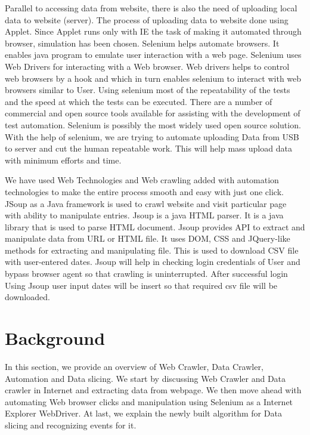 \documentclass[12pt]{report}
\begin{document}
Parallel to accessing data from website, there is also the need of uploading local data to website (server). The process of uploading data to website done using Applet. Since Applet runs only with IE the task of making it automated through browser, simulation has been chosen. Selenium helps automate browsers. It enables java program to emulate user interaction with a web page. Selenium uses Web Drivers for interacting with a Web browser. Web drivers helps to control web browsers by a hook and which in turn enables selenium to interact with web browsers similar to User. Using selenium most of the repeatability of the tests and the speed at which the tests can be executed. There are a number of commercial and open source tools available for assisting with the development of test automation. Selenium is possibly the most widely used open source solution. With the help of selenium, we are trying to automate uploading Data from USB to server and cut the human repeatable work. This will help mass upload data with minimum efforts and time.

We have used Web Technologies and Web crawling added with automation technologies to make the entire process smooth and easy with just one click. JSoup as a Java framework is used to crawl website and visit particular page with ability to manipulate entries. Jsoup is a java HTML parser. It is a java library that is used to parse HTML document. Jsoup provides API to extract and manipulate data from URL or HTML file. It uses DOM, CSS and JQuery-like methods for extracting and manipulating file. This is used to download CSV file with user-entered dates. Jsoup will help in checking login credentials of User and bypass browser agent so that crawling is uninterrupted. After successful login Using Jsoup user input dates will be insert so that required csv file will be downloaded. 


\section*{Background}
In this section, we provide an overview of Web Crawler, Data Crawler, Automation and Data slicing. We start by discussing Web Crawler and Data crawler in Internet and extracting data from webpage. We then move ahead with automating Web browser clicks and manipulation using Selenium as a Internet Explorer WebDriver. At last, we explain the newly built algorithm for Data slicing and recognizing events for it.
\end{document}
